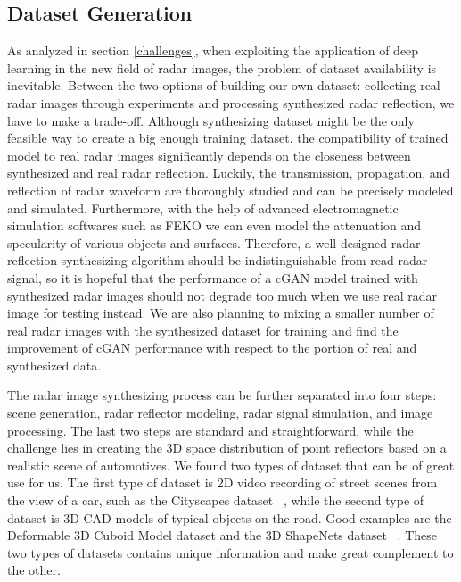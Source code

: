 \subsection{Dataset Generation} \label{dataset}
As analyzed in section \ref{challenges}, when exploiting the application of deep learning in the new field of radar images, the problem of dataset availability is inevitable. Between the two options of building our own dataset: collecting real radar images through experiments and processing synthesized radar reflection, we have to make a trade-off. Although synthesizing dataset might be the only feasible way to create a big enough training dataset, the compatibility of trained model to real radar images significantly depends on the closeness between synthesized  and real radar reflection. Luckily, the transmission, propagation, and reflection of radar waveform are thoroughly studied and can be precisely modeled and simulated. Furthermore, with the help of advanced electromagnetic simulation softwares such as FEKO we can even model the attenuation and specularity of various objects and surfaces. Therefore, a well-designed radar reflection synthesizing algorithm should be indistinguishable from read radar signal, so it is hopeful that the performance of a cGAN model trained with synthesized radar images should not degrade too much when we use real radar image for testing instead. We are also planning to mixing a smaller number of real radar images with the synthesized dataset for training and find the improvement of cGAN performance with respect to the portion of real and synthesized data.  

The radar image synthesizing process can be further separated into four steps: scene generation, radar reflector modeling, radar signal simulation, and image processing. The last two steps are standard and straightforward, while the challenge lies in creating the 3D space distribution of point reflectors based on a realistic scene of automotives. We found two types of dataset that can be of great use for us. The first type of dataset is 2D video recording of street scenes from the view of a car, such as the Cityscapes dataset ~\cite{cityscapes}, while the second type of dataset is 3D CAD models of typical objects on the road. Good examples are the Deformable 3D Cuboid Model dataset and the 3D ShapeNets dataset ~\cite{3Ddata, shapenets}. These two types of datasets contains unique information and make great complement to the other.

